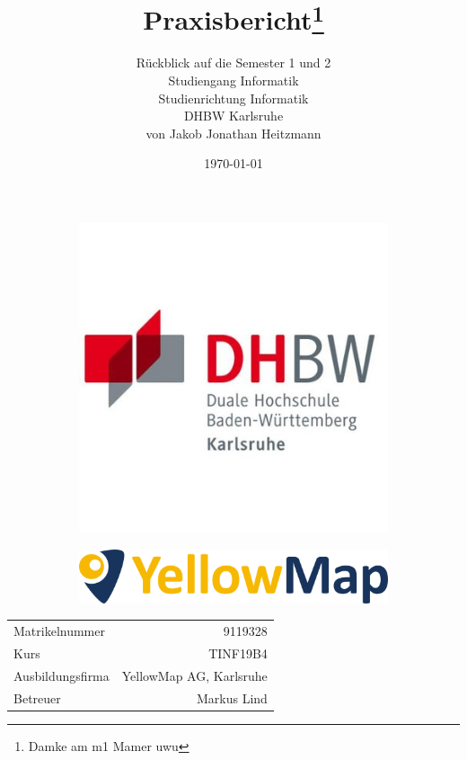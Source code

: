 \documentclass[12pt,a4paper]{article}
\title{Praxisbericht\thanks{Damke am m1 Mamer uwu}}
\author{R\"uckblick auf die Semester 1 und 2\\
	Studiengang Informatik\\
	Studienrichtung Informatik\\
	DHBW Karlsruhe\\
	von Jakob Jonathan Heitzmann
}
\date{\today}
\begin{document}

\begin{figure}[t!]
	\begin{subfigure}{0.4\linewidth}
		\includegraphics[scale=0.25]{DHBWKarlsruhe.jpg}
	\end{subfigure}
	\hspace*{\fill}
	\begin{subfigure}{0.4\linewidth}
    	\includegraphics[scale=0.25]{YellowMap.png}
	\end{subfigure} 
\end{figure}

\maketitle
\vspace*{\fill}


\begin{center}
	\begin{tabular}{p{8cm}r}
		Matrikelnummer & 9119328\\
		Kurs & TINF19B4\\
		Ausbildungsfirma & YellowMap AG, Karlsruhe\\
		Betreuer & Markus Lind
	\end{tabular}
\end{center}
\newpage
\end{document}
